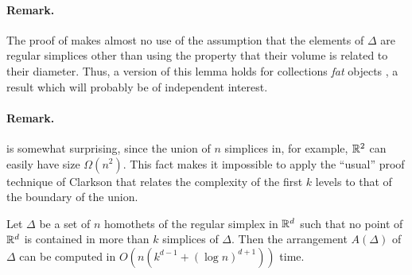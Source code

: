 \documentclass[lotsofwhite]{patmorin}
\begin{document}
\paragraph{Remark.} The proof of  makes almost no use
of the assumption that the elements of $\Delta$ are regular simplices other
than using the property that their volume is related to their diameter.
Thus, a version of this lemma holds for collections \emph{fat} objects
\cite{X}, a result which will probably be of independent interest.

\paragraph{Remark.}  is somewhat surprising, since the
union of $n$ simplices in, for example, $\mathbb{R}^2$ can easily have size
$\Omega(n^2)$.  This fact makes it impossible to apply the ``usual'' proof
technique of Clarkson that relates the complexity of the first $k$ levels
to that of the boundary of the union.

\begin{lem}
Let $\Delta$ be a set of $n$ homothets of the regular simplex in $\mathbb{R}^d$
such that no point of $\mathbb{R}^d$ is contained in more than $k$ simplices of
$\Delta$.  Then the arrangement $A(\Delta)$ of $\Delta$ can be computed
in $O(n(k^{d-1}+(\log n)^{d+1}))$ time.
\end{lem}
\end{document}
